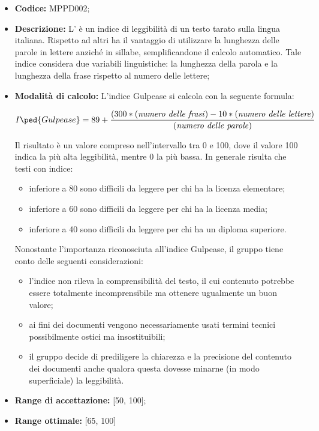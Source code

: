 \documentclass[openany,12pt,a4paper]{report}
\begin{document}
\begin{itemize}
    \item \textbf{Codice:} MPPD002;

    \item \textbf{Descrizione:} L’ è un indice di leggibilità di un testo tarato sulla lingua italiana. Rispetto ad altri ha il vantaggio di utilizzare la lunghezza delle parole in lettere anziché in sillabe, semplificandone il calcolo automatico. Tale indice considera due variabili linguistiche: la lunghezza della parola e la lunghezza della frase rispetto al numero delle lettere;
    
    \item \textbf{Modalità di calcolo:} L'indice Gulpease si calcola con la seguente formula:

    \[ I\ped{Gulpease} = 89 +  \frac{(300*(\textrm{\textit{numero delle frasi}})-10*(\textrm{\textit{numero delle lettere}})}{(\textrm{\textit{numero delle parole}})} \]
    
    Il risultato è un valore compreso nell’intervallo tra 0 e 100, dove il valore 100 indica la
    più alta leggibilità, mentre 0 la più bassa. In generale risulta che testi con indice:
        \begin{itemize}
            \item inferiore a 80 sono difficili da leggere per chi ha la licenza elementare; 
            \item inferiore a 60 sono difficili da leggere per chi ha la licenza media;
            \item inferiore a 40 sono difficili da leggere per chi ha un diploma superiore.
        \end{itemize}
            
    Nonostante l'importanza riconosciuta all'indice Gulpease, il gruppo tiene conto delle seguenti considerazioni:
    \begin{itemize}
        \item l'indice non rileva la comprensibilità del testo, il cui contenuto potrebbe essere totalmente incomprensibile ma ottenere ugualmente un buon valore; 
        \item ai fini dei documenti vengono necessariamente usati termini tecnici possibilmente ostici ma insostituibili;
        \item il gruppo decide di prediligere la chiarezza e la precisione del contenuto dei documenti anche qualora questa dovesse minarne (in modo superficiale) la leggibilità.
    \end{itemize}
    
    \item \textbf{Range di accettazione:} [50, 100];
    \item \textbf{Range ottimale:} [65, 100]
\end{itemize}
\end{document}
